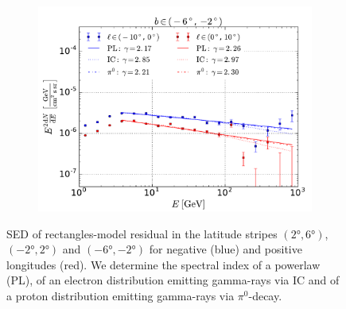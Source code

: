 \begin{figure}[h!]
\begin{subfigure}{0.49\textwidth}
        \includegraphics[width=\textwidth]{plots/SED_boxes_source_-4.pdf}
    \end{subfigure}
  	\caption{SED of rectangles-model residual in the latitude stripes $(\ang{2}, \ang{6})$, $(\ang{-2}, \ang{2})$ and $(\ang{-6}, \ang{-2})$ for negative (blue) and positive longitudes (red). We determine the spectral index of a powerlaw (PL), of an electron distribution emitting gamma-rays via IC and of a proton distribution emitting gamma-rays via $\pi^0$-decay.}
  	\label{fig:SED_with_fits}
\end{figure}


%

